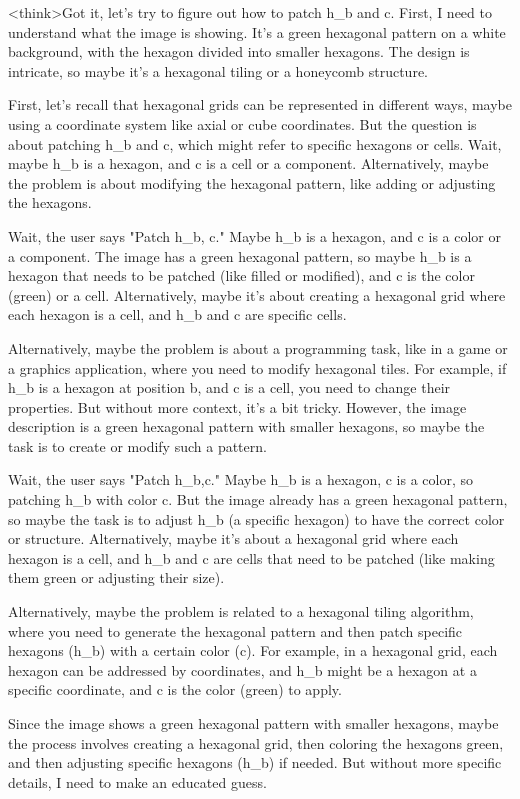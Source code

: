 <think>Got it, let's try to figure out how to patch h_b and c. First, I need to understand what the image is showing. It's a green hexagonal pattern on a white background, with the hexagon divided into smaller hexagons. The design is intricate, so maybe it's a hexagonal tiling or a honeycomb structure. 

First, let's recall that hexagonal grids can be represented in different ways, maybe using a coordinate system like axial or cube coordinates. But the question is about patching h_b and c, which might refer to specific hexagons or cells. Wait, maybe h_b is a hexagon, and c is a cell or a component. Alternatively, maybe the problem is about modifying the hexagonal pattern, like adding or adjusting the hexagons. 

Wait, the user says "Patch h_b, c." Maybe h_b is a hexagon, and c is a color or a component. The image has a green hexagonal pattern, so maybe h_b is a hexagon that needs to be patched (like filled or modified), and c is the color (green) or a cell. Alternatively, maybe it's about creating a hexagonal grid where each hexagon is a cell, and h_b and c are specific cells. 

Alternatively, maybe the problem is about a programming task, like in a game or a graphics application, where you need to modify hexagonal tiles. For example, if h_b is a hexagon at position b, and c is a cell, you need to change their properties. But without more context, it's a bit tricky. However, the image description is a green hexagonal pattern with smaller hexagons, so maybe the task is to create or modify such a pattern. 

Wait, the user says "Patch h_b,c." Maybe h_b is a hexagon, c is a color, so patching h_b with color c. But the image already has a green hexagonal pattern, so maybe the task is to adjust h_b (a specific hexagon) to have the correct color or structure. Alternatively, maybe it's about a hexagonal grid where each hexagon is a cell, and h_b and c are cells that need to be patched (like making them green or adjusting their size). 

Alternatively, maybe the problem is related to a hexagonal tiling algorithm, where you need to generate the hexagonal pattern and then patch specific hexagons (h_b) with a certain color (c). For example, in a hexagonal grid, each hexagon can be addressed by coordinates, and h_b might be a hexagon at a specific coordinate, and c is the color (green) to apply. 

Since the image shows a green hexagonal pattern with smaller hexagons, maybe the process involves creating a hexagonal grid, then coloring the hexagons green, and then adjusting specific hexagons (h_b) if needed. But without more specific details, I need to make an educated guess. 

